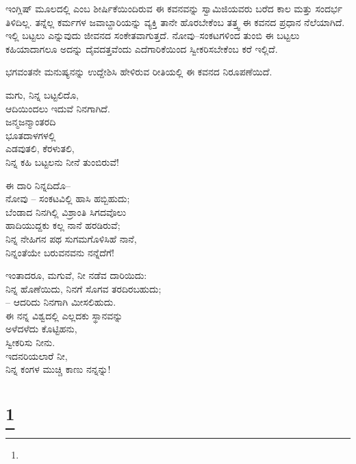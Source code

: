 ಇಂಗ್ಲಿಷ್ ಮೂಲದಲ್ಲಿ  ಎಂಬ ಶೀರ್ಷಿಕೆಯಿಂದಿರುವ ಈ ಕವನವನ್ನು ಸ್ವಾಮಿಜಿಯವರು ಬರೆದ ಕಾಲ ಮತ್ತು ಸಂದರ್ಭ ತಿಳಿದಿಲ್ಲ. ತನ್ನೆಲ್ಲ ಕರ್ಮಗಳ ಜವಾಬ್ದಾರಿಯನ್ನು ವ್ಯಕ್ತಿ ತಾನೇ ಹೊರಬೇಕೆಂಬ ತತ್ತ್ವ ಈ ಕವನದ ಪ್ರಧಾನ ನೆಲೆಯಾಗಿದೆ. ಇಲ್ಲಿ ಬಟ್ಟಲು ಎನ್ನುವುದು ಜೀವನದ ಸಂಕೇತವಾಗುತ್ತದೆ. ನೋವು–ಸಂಕಟಗಳಿಂದ ತುಂಬಿ ಈ ಬಟ್ಟಲು ಕಹಿಯಾದಾಗಲೂ ಅದನ್ನು ದೈವದತ್ತವೆಂದು ಎದೆಗಾರಿಕೆಯಿಂದ ಸ್ವೀಕರಿಸಬೇಕೆಂಬ ಕರೆ ಇಲ್ಲಿದೆ.

ಭಗವಂತನೇ ಮನುಷ್ಯನನ್ನು ಉದ್ದೇಶಿಸಿ ಹೇಳಿರುವ ರೀತಿಯಲ್ಲಿ ಈ ಕವನದ ನಿರೂಪಣೆಯಿದೆ.

\begin{myquote}
ಮಗು, ನಿನ್ನ ಬಟ್ಟಲಿದೊ,\\ಆದಿಯಿಂದಲು ಇದುವೆ ನಿನಗಾಗಿದೆ.\\ಜನ್ಮಜನ್ಮಾಂತರದಿ\\ಭೂತದಾಳಗಳಲ್ಲಿ\\ಎಡವುತಲಿ, ಕೆರಳುತಲಿ,\\ನಿನ್ನ ಕಹಿ ಬಟ್ಟಲನು ನೀನೆ ತುಂಬಿರುವೆ!
\end{myquote}

\begin{myquote}
ಈ ದಾರಿ ನಿನ್ನದಿದೊ–\\ನೋವು – ಸಂಕಟವಿಲ್ಲಿ ಹಾಸಿ ಹಬ್ಬಿಹುದು;\\ಬೆಂಡಾದ ನಿನಗಿಲ್ಲಿ ವಿಶ್ರಾಂತಿ ಸಿಗದವೊಲು\\ಹಾದಿಯುದ್ದಕು ಕಲ್ಲ ನಾನೆ ಹರಡಿರುವೆ;\\ನಿನ್ನ ನೇಹಿಗನ ಪಥ ಸುಗಮಗೊಳಿಸಿಹೆ ನಾನೆ,\\ನಿನ್ನಂತೆಯೇ ಬರುವನವನು ನನ್ನೆದೆಗೆ!
\end{myquote}

\begin{myquote}
ಇಂತಾದರೂ, ಮಗುವೆ, ನೀ ನಡೆವ ದಾರಿಯಿದು:\\ನಿನ್ನ ಹೊಣೆಯಿದು, ನಿನಗೆ ಸೊಗವ ತರದಿರಬಹುದು;\\
– ಆದರಿದು ನಿನಗಾಗಿ ಮೀಸಲಿಹುದು.\\ಈ ನನ್ನ ವಿಶ್ವದಲ್ಲಿ ಎಲ್ಲದಕು ಸ್ಥಾನವನ್ನು\\ಅಳೆದಳೆದು ಕೊಟ್ಟಿಹನು,\\ಸ್ವೀಕರಿಸು ನೀನು.\\ಇದನರಿಯಲಾರೆ ನೀ,\\ನಿನ್ನ ಕಂಗಳ ಮುಚ್ಚಿ ಕಾಣು ನನ್ನನ್ನು!
\end{myquote}

\selecteng

\chapter[A BENEDICTION]{\protect\footnote{}}

\begin{myquote}
\end{myquote}

